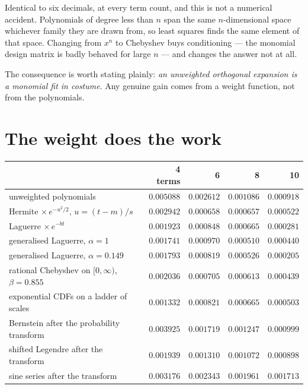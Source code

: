 \documentclass[12pt,a4paper]{article}
\begin{document}
Identical to six decimals, at every term count, and this is not a numerical accident. Polynomials of degree less than $n$ span the same $n$-dimensional space whichever family they are drawn from, so least squares finds the same element of that space. Changing from $x^n$ to Chebyshev buys conditioning --- the monomial design matrix is badly behaved for large $n$ --- and changes the answer not at all.

The consequence is worth stating plainly: \emph{an unweighted orthogonal expansion is a monomial fit in costume}. Any genuine gain comes from a weight function, not from the polynomials.

\section{The weight does the work}

\begin{center}
\begin{tabular}{lrrrr}
\toprule
 & 4 terms & 6 & 8 & 10 \\
\midrule
unweighted polynomials                       & $0.005088$ & $0.002612$ & $0.001086$ & $0.000918$ \\
Hermite $\times\, e^{-u^2/2}$, $u=(t-m)/s$   & $0.002942$ & $\mathbf{0.000658}$ & $0.000657$ & $0.000522$ \\
Laguerre $\times\, e^{-bt}$                  & $0.001923$ & $0.000848$ & $0.000665$ & $0.000281$ \\
generalised Laguerre, $\alpha=1$             & $0.001741$ & $0.000970$ & $\mathbf{0.000510}$ & $0.000440$ \\
generalised Laguerre, $\alpha=0.149$         & $0.001793$ & $0.000819$ & $0.000526$ & $0.000205$ \\
rational Chebyshev on $[0,\infty)$, $\beta=0.855$ & $0.002036$ & $0.000705$ & $0.000613$ & $0.000439$ \\
exponential CDFs on a ladder of scales       & $\mathbf{0.001332}$ & $0.000821$ & $0.000665$ & $0.000503$ \\
Bernstein after the probability transform    & $0.003925$ & $0.001719$ & $0.001247$ & $0.000999$ \\
shifted Legendre after the transform         & $0.001939$ & $0.001310$ & $0.001072$ & $0.000898$ \\
sine series after the transform              & $0.003176$ & $0.002343$ & $0.001961$ & $0.001713$ \\
\bottomrule
\end{tabular}
\end{center}
\end{document}
